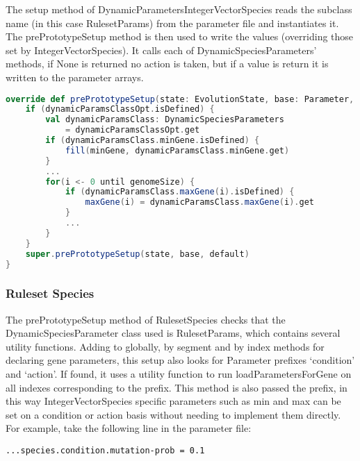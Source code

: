 The setup method of DynamicParametersIntegerVectorSpecies reads the subclass name (in this case RulesetParams) from the parameter file and instantiates it. The prePrototypeSetup method is then used to write the values (overriding those set by IntegerVectorSpecies). It calls each of DynamicSpeciesParameters' methods, if None is returned no action is taken, but if a value is return it is written to the parameter arrays.

\begin{minipage}{0.9\linewidth}
\centering
\begin{lstlisting}[language=scala]
override def prePrototypeSetup(state: EvolutionState, base: Parameter, default: Parameter): Unit = {
    if (dynamicParamsClassOpt.isDefined) {
        val dynamicParamsClass: DynamicSpeciesParameters
            = dynamicParamsClassOpt.get
        if (dynamicParamsClass.minGene.isDefined) {
            fill(minGene, dynamicParamsClass.minGene.get)
        }
        ...
        for(i <- 0 until genomeSize) {
            if (dynamicParamsClass.maxGene(i).isDefined) {
                maxGene(i) = dynamicParamsClass.maxGene(i).get
            }
            ...
        }
    }
    super.prePrototypeSetup(state, base, default)
}

\end{lstlisting}
\end{minipage}

\subsubsection*{\hspace{6pt}Ruleset Species}

The prePrototypeSetup method of RulesetSpecies checks that the DynamicSpeciesParameter class used is RulesetParams, which contains several utility functions. Adding to globally, by segment and by index methods for declaring gene parameters, this setup also looks for Parameter prefixes `{\ttfamily condition}' and `{\ttfamily action}'. If found, it uses a utility function to run loadParametersForGene on all indexes corresponding to the prefix. This method is also passed the prefix, in this way IntegerVectorSpecies specific parameters such as min and max can be set on a condition or action basis without needing to implement them directly. For example, take the following line in the parameter file:

\begin{minipage}{0.9\linewidth}
\centering
\begin{lstlisting}
...species.condition.mutation-prob = 0.1
\end{lstlisting}
\end{minipage}

